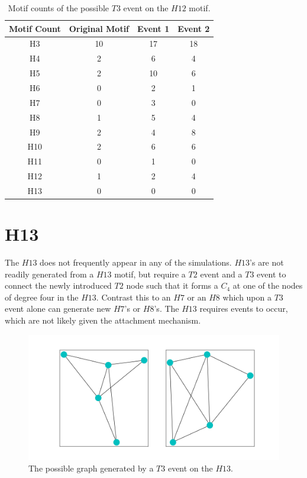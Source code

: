 \begin{table}
    \centering
    \begin{tabular}{||c c c c||} 
    \hline
    Motif Count & Original Motif & Event 1 & Event 2\\ [0.5ex] 
    \hline\hline
    H3 & 10 & 17 & 18 \\ 
    \hline
    H4 & 2 & 6 & 4 \\
    \hline
    H5 & 2 & 10 & 6\\
    \hline
    H6 & 0 & 2 & 1 \\
    \hline
    H7 & 0 & 3 & 0\\
    \hline
    H8 & 1 & 5 & 4 \\
    \hline
    H9 & 2 & 4 & 8 \\
    \hline
    H10 & 2 & 6 & 6 \\
    \hline
    H11 & 0 & 1 & 0 \\
    \hline
    H12 & 1 & 2 & 4 \\
    \hline
    H13 & 0 & 0 & 0\\
    \hline
   \end{tabular}
   \caption{Motif counts of the possible $T3$ event on the $H12$ motif.}
   \label{table:H13T3}
\end{table}

\section{H13}
The $H13$ does not frequently appear in any of the simulations. $H13$'s
are not readily generated from a $H13$ motif, but require a $T2$ event
and a $T3$ event to connect the newly introduced $T2$ node such that it forms a
$C_4$ at one of the nodes of degree four in the $H13$. Contrast this to an $H7$
or an $H8$ which upon a $T3$ event alone can generate new $H7$'s or $H8$'s. The $H13$
requires events to occur, which are not likely given the attachment mechanism. 

\begin{figure}
    \includegraphics[width=12cm]{Images/H13_T3_evolution.png}
    \centering
    \caption{The possible graph generated by a $T3$ event on the $H13$.}
\end{figure}

